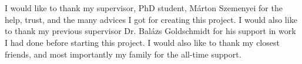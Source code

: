 \chapter*{\koszonetnyilvanitas}

I would like to thank my supervisor, PhD student, Márton Szemenyei for the help,
trust, and the many advices I got for creating this project. I would also like
to thank my previous supervisor Dr. Balázs Goldschmidt for his support in work I
had done before starting this project. I would also like to thank my closest
friends, and most importantly my family for the all-time support.